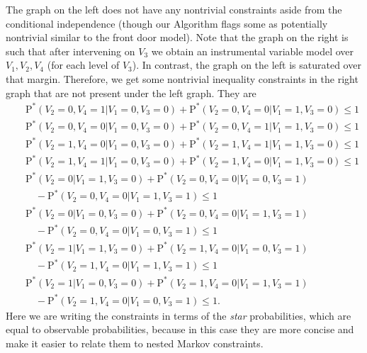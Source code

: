 \documentclass[12pt]{article}
\def\Pdo{{\mathrm{P}^*}}
\begin{document}
The graph on the left does not have any nontrivial constraints aside from the conditional independence (though our Algorithm flags some as potentially nontrivial similar to the front door model). Note that the graph on the right is such that after intervening on $V_3$ we obtain an instrumental variable model over $V_1,V_2,V_4$ (for each level of $V_3$).  In contrast, the graph on the left is saturated over that margin. Therefore, we get some nontrivial inequality constraints in the right graph that are not present under the left graph. They are 
\begin{eqnarray*}
&& \Pdo(V_2 = 0, V_4 = 1 | V_1 = 0, V_3 = 0) + \Pdo(V_2 = 0, V_4 = 0 | V_1 = 1, V_3 = 0) \leq 1 \\
&& \Pdo(V_2 = 0, V_4 = 0 | V_1 = 0, V_3 = 0) + \Pdo(V_2 = 0, V_4 = 1 | V_1 = 1, V_3 = 0) \leq 1 \\
&& \Pdo(V_2 = 1, V_4 = 0 | V_1 = 0, V_3 = 0) + \Pdo(V_2 = 1, V_4 = 1 | V_1 = 1, V_3 = 0) \leq 1 \\ 
&& \Pdo(V_2 = 1, V_4 = 1 | V_1 = 0, V_3 = 0) + \Pdo(V_2 = 1, V_4 = 0 | V_1 = 1, V_3 = 0) \leq 1 \\ 
&& \Pdo(V_2 = 0 | V_1 = 1, V_3 = 0) + \Pdo(V_2 = 0, V_4 = 0 | V_1 = 0, V_3 = 1) \\ 
&& \quad - \Pdo(V_2 = 0, V_4 = 0 | V_1 = 1, V_3 = 1) \leq 1 \\ 
&& \Pdo(V_2 = 0 | V_1 = 0, V_3 = 0) + \Pdo(V_2 = 0, V_4 = 0 | V_1 = 1, V_3 = 1) \\ 
&& \quad - \Pdo(V_2 = 0, V_4 = 0 | V_1 = 0, V_3 = 1) \leq 1 \\ 
&& \Pdo(V_2 = 1 | V_1 = 1, V_3 = 0) + \Pdo(V_2 = 1, V_4 = 0 | V_1 = 0, V_3 = 1) \\ 
&& \quad - \Pdo(V_2 = 1, V_4 = 0 | V_1 = 1, V_3 = 1) \leq 1 \\ 
&& \Pdo(V_2 = 1 | V_1 = 0, V_3 = 0) + \Pdo(V_2 = 1, V_4 = 0 | V_1 = 1, V_3 = 1) \\ 
&& \quad - \Pdo(V_2 = 1, V_4 = 0 | V_1 = 0, V_3 = 1) \leq 1.
\end{eqnarray*}
Here we are writing the constraints in terms of the \emph{star} probabilities, which are equal to observable probabilities, because in this case they are more concise and make it easier to relate them to nested Markov constraints. 
\end{document}
